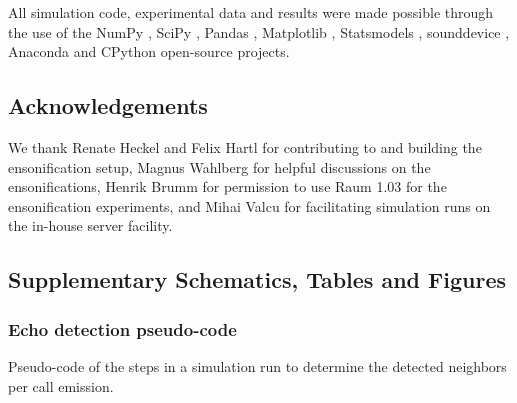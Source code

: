 \documentclass[
]{book}
\begin{document}
All simulation code, experimental data and results were made possible through the use of the NumPy \citep{oliphant2006a}, SciPy \citep{virtanen2019a}, Pandas \citep{mckinney2010a}, Matplotlib \citep{hunter2007a}, Statsmodels \citep{seabold2010a}, sounddevice \citep{geier2015a}, Anaconda \citep{anaconda2016a} and CPython \citep{rossum1991a} open-source projects.

\hypertarget{acknowledgements-1}{%
\subsection{Acknowledgements}\label{acknowledgements-1}}

We thank Renate Heckel and Felix Hartl for contributing to and building the ensonification setup, Magnus Wahlberg for helpful discussions on the ensonifications, Henrik Brumm for permission to use Raum 1.03 for the ensonification experiments, and Mihai Valcu for facilitating simulation runs on the in-house server facility.

\newpage

\hypertarget{supplementary-schematics-tables-and-figures}{%
\subsection{Supplementary Schematics, Tables and Figures}\label{supplementary-schematics-tables-and-figures}}

\subsubsection{Echo detection pseudo-code}\label{cpn_schem_1}

Pseudo-code of the steps in a simulation run to determine the detected neighbors per call emission.
\end{document}
